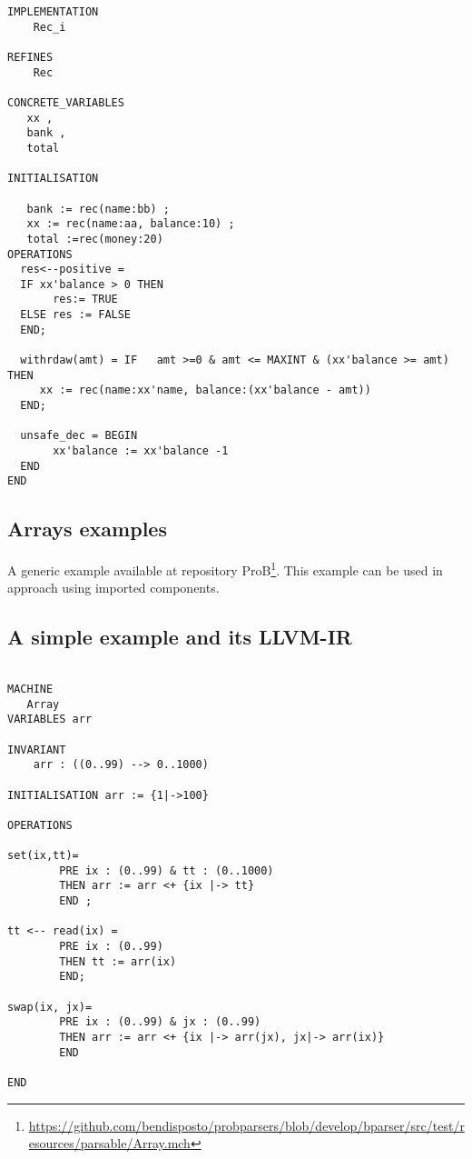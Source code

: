 \documentclass[10pt,a4paper]{article}
\begin{document}
\begin{verbatim}
IMPLEMENTATION
    Rec_i

REFINES
    Rec

CONCRETE_VARIABLES
   xx ,
   bank ,
   total

INITIALISATION
   
   bank := rec(name:bb) ;
   xx := rec(name:aa, balance:10) ;
   total :=rec(money:20)
OPERATIONS
  res<--positive = 
  IF xx'balance > 0 THEN
       res:= TRUE 
  ELSE res := FALSE
  END;

  withrdaw(amt) = IF   amt >=0 & amt <= MAXINT & (xx'balance >= amt) THEN 
     xx := rec(name:xx'name, balance:(xx'balance - amt))
  END;

  unsafe_dec = BEGIN
       xx'balance := xx'balance -1 
  END
END
\end{verbatim}




\subsection{Arrays examples}

A generic example available at repository ProB\footnote{
\url{https://github.com/bendisposto/probparsers/blob/develop/bparser/src/test/resources/parsable/Array.mch}}. 
This example can be used in approach using imported components.




\subsection{A  simple example and its LLVM-IR}


\begin{verbatim}

MACHINE
   Array
VARIABLES arr

INVARIANT 
    arr : ((0..99) --> 0..1000)

INITIALISATION arr := {1|->100}

OPERATIONS 

set(ix,tt)=
        PRE ix : (0..99) & tt : (0..1000)
        THEN arr := arr <+ {ix |-> tt}
        END ;

tt <-- read(ix) =
        PRE ix : (0..99)
        THEN tt := arr(ix)
        END;

swap(ix, jx)=
        PRE ix : (0..99) & jx : (0..99)
        THEN arr := arr <+ {ix |-> arr(jx), jx|-> arr(ix)}
        END

END
\end{verbatim}
\end{document}
